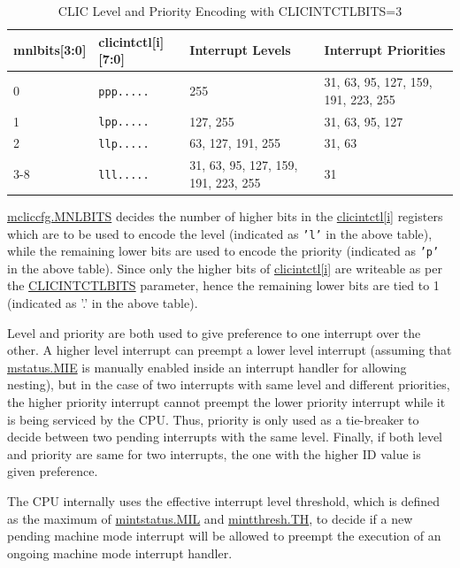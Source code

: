 \documentclass[main\_\_EN.tex]{subfiles}
\begin{document}
\begin{longtable}{ | l | l | l | l | }
\caption{CLIC Level and Priority Encoding with CLICINTCTLBITS=3}
\label{tab:riscv-clic-level-priority}
\\\hline
\rowcolor{lightgray}
mnlbits[3:0] & clicintctl[i][7:0] & Interrupt Levels & Interrupt Priorities \\ \hline
0   & \texttt{ppp.....} & 255 & 31, 63, 95, 127, 159, 191, 223, 255 \\ \hline
1   & \texttt{lpp.....} & 127, 255 & 31, 63, 95, 127 \\ \hline
2   & \texttt{llp.....} & 63, 127, 191, 255 & 31, 63 \\ \hline
3-8 & \texttt{lll.....} & 31, 63, 95, 127, 159, 191, 223, 255 & 31 \\ \hline
\end{longtable}

\hyperref[fielddesc:MCLICCFG_MNLBITS]{mcliccfg.MNLBITS} decides the number of higher bits in the \hyperref[regdesc:MCLICINTCTL_REG_i]{clicintctl[i]} registers which are to be used to encode the level (indicated as \texttt{'l'} in the above table), while the remaining lower bits are used to encode the priority (indicated as \texttt{'p'} in the above table). Since only the higher bits of \hyperref[regdesc:MCLICINTCTL_REG_i]{clicintctl[i]} are writeable as per the \hyperref[fielddesc:CLICINFO_CLICINTCTLBITS]{CLICINTCTLBITS} parameter, hence the remaining lower bits are tied to 1 (indicated as '.' in the above table).

Level and priority are both used to give preference to one interrupt over the other. A higher level interrupt can preempt a lower level interrupt (assuming that \hyperref[fielddesc:MSTATUSMIE]{mstatus.MIE} is manually enabled inside an interrupt handler for allowing nesting), but in the case of two interrupts with same level and different priorities, the higher priority interrupt cannot preempt the lower priority interrupt while it is being serviced by the CPU. Thus, priority is only used as a tie-breaker to decide between two pending interrupts with the same level. Finally, if both level and priority are same for two interrupts, the one with the higher ID value is given preference.


The CPU internally uses the effective interrupt level threshold, which is defined as the maximum of \hyperref[fielddesc:MINTSTATUS_MIL]{{mintstatus.MIL}} and \hyperref[fielddesc:MINTTHRESH_TH]{{mintthresh.TH}}, to decide if a new pending machine mode interrupt will be allowed to preempt the execution of an ongoing machine mode interrupt handler.
\end{document}
